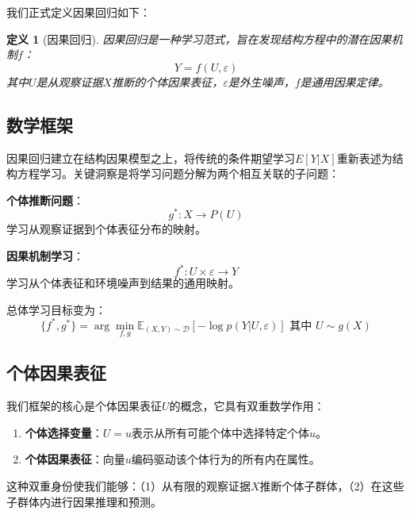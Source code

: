 \documentclass[conference]{IEEEtran}
\newtheorem{definition}{定义}[section]
\newcommand{\expectation}{\mathbb{E}}
\begin{document}
\begin{CJK}{UTF8}{gbsn}
我们正式定义因果回归如下：

\begin{definition}[因果回归]
因果回归是一种学习范式，旨在发现结构方程中的潜在因果机制$f$：
\begin{equation}
Y = f(U, \varepsilon)
\end{equation}
其中$U$是从观察证据$X$推断的个体因果表征，$\varepsilon$是外生噪声，$f$是通用因果定律。
\end{definition}

\subsection{数学框架}

因果回归建立在结构因果模型之上，将传统的条件期望学习$E[Y|X]$重新表述为结构方程学习。关键洞察是将学习问题分解为两个相互关联的子问题：

\textbf{个体推断问题}：
\begin{equation}
g^*: X \rightarrow P(U)
\end{equation}
学习从观察证据到个体表征分布的映射。

\textbf{因果机制学习}：
\begin{equation}
f^*: U \times \varepsilon \rightarrow Y  
\end{equation}
学习从个体表征和环境噪声到结果的通用映射。

总体学习目标变为：
\begin{equation}
\{f^*, g^*\} = \arg\min_{f,g} \expectation_{(X,Y) \sim \mathcal{D}}[-\log p(Y|U,\varepsilon)] \text{ 其中 } U \sim g(X)
\end{equation}

\subsection{个体因果表征}

我们框架的核心是个体因果表征$U$的概念，它具有双重数学作用：

\begin{enumerate}
\item \textbf{个体选择变量}：$U = u$表示从所有可能个体中选择特定个体$u$。

\item \textbf{个体因果表征}：向量$u$编码驱动该个体行为的所有内在属性。
\end{enumerate}

这种双重身份使我们能够：（1）从有限的观察证据$X$推断个体子群体，（2）在这些子群体内进行因果推理和预测。


\end{CJK}
\end{document}
